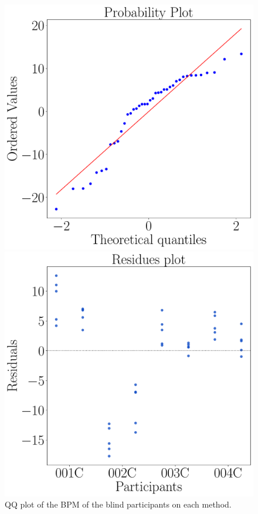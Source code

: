 \begin{figure}[!htb]
    \centering
    \begin{minipage}{0.45\textwidth}
        \centering
        \includegraphics[width = \textwidth]{Resultados/ECG/Figuras/pdf/qqplot_bpm_two_way_blind.pdf}
        \caption{QQ plot of the BPM of the blind participants on each method.}
        \label{fig:qqplot_bpm_two_way_blind}
    \end{minipage}
    \begin{minipage}{0.075\textwidth}
        \hfill
    \end{minipage}
    \begin{minipage}{0.45\textwidth}
        \centering
        \includegraphics[width = \textwidth]{Resultados/ECG/Figuras/pdf/residplot_bpm_two_way_blind.pdf}

\end{minipage}
\end{figure}

